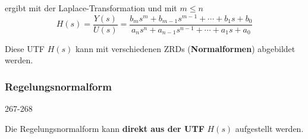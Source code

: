 ergibt mit der Laplace-Transformation und mit $m \leq n$
$$ \boxed{ H(s) = \frac{Y(s)}{U(s)} = \frac{b_m s^m + b_{m-1} s^{m-1} + \cdots + b_1 s + b_0}
{a_n s^n + a_{n-1} s^{n-1} + \cdots + a_1 s + a_0} }$$

Diese UTF $H(s)$ kann mit verschiedenen ZRDs (\textbf{Normalformen}) abgebildet werden. \\


\subsubsection{Regelungsnormalform}{267-268}

Die Regelungsnormalform kann \textbf{direkt aus der UTF} $H(s)$ aufgestellt werden.

